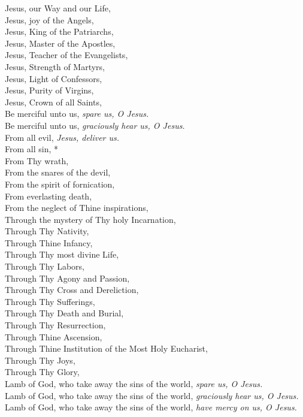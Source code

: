 \documentclass[9pt]{article}
\begin{document}
\begin{multicols}{3}
Jesus, our Way and our Life,\\ 
Jesus, joy of the Angels,\\
Jesus, King of the Patriarchs,\\ 
Jesus, Master of the Apostles,\\
Jesus, Teacher of the Evangelists,\\ 
Jesus, Strength of Martyrs,\\
Jesus, Light of Confessors,\\
Jesus, Purity of Virgins,\\
Jesus, Crown of all Saints,\\
Be merciful unto us, \textit{spare us, O Jesus.}\\
Be merciful unto us, \textit{graciously hear us, O Jesus.}\\
From all evil, \textit{Jesus, deliver us.}\\
From all sin, *\\
From Thy wrath,\\
From the snares of the devil,\\
From the spirit of fornication,\\
From everlasting death,\\
From the neglect of Thine inspirations,\\
Through the mystery of Thy holy Incarnation,\\
Through Thy Nativity,\\
Through Thine Infancy,\\
Through Thy most divine Life,\\
Through Thy Labors,\\
Through Thy Agony and Passion,\\
Through Thy Cross and Dereliction,\\
Through Thy Sufferings,\\
Through Thy Death and Burial,\\
Through Thy Resurrection,\\
Through Thine Ascension,\\
Through Thine Institution of the Most Holy Eucharist,\\
Through Thy Joys,\\
Through Thy Glory,\\
Lamb of God, who take away the sins of the world, \textit{spare us, O Jesus.}\\
Lamb of God, who take away the sins of the world, \textit{graciously hear us, O Jesus.}\\
Lamb of God, who take away the sins of the world, \textit{have mercy on us, O Jesus.}\\

\end{multicols}
\end{document}
